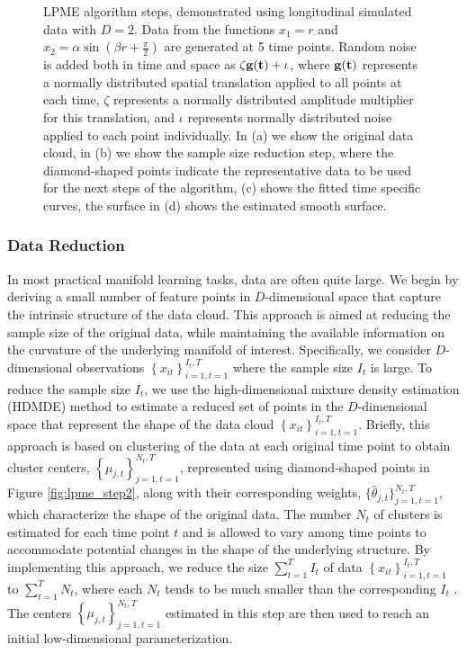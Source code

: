 \documentclass[12pt]{article}
\theoremstyle{definition}
\begin{document}
\begin{figure}
  \caption{{\footnotesize LPME algorithm steps, demonstrated using longitudinal simulated data with $D=2$. Data from the functions $x_1 = r$ and $x_2 = \alpha \sin \left(\beta r + \frac{\pi}{2}\right)$ are generated at 5 time points. Random noise is added both in time and space as $\zeta \bf{g}(t) + \iota$, where $\bf{g}(t)$ represents a normally distributed spatial translation applied to all points at each time, $\zeta$ represents a normally distributed amplitude multiplier for this translation, and $\iota$ represents normally distributed noise applied to each point individually. In (a) we show the original data cloud, in (b) we show the sample size reduction step, where the diamond-shaped points indicate the representative data to be used for the next steps of the algorithm, (c) shows the fitted time specific curves, the surface in (d) shows the estimated smooth surface.} }
  \label{fig:lpme_steps}
\end{figure}


\subsubsection{Data Reduction}

In most practical manifold learning tasks, data are often quite large. We begin by deriving a small number of feature points in $D$-dimensional space that capture the intrinsic structure of the data cloud. This approach is aimed at reducing the sample size of the original data, while maintaining the available information on the curvature of the underlying manifold of interest. Specifically, we consider $D$-dimensional observations $\left\{x_{it}\right\}_{i=1, t=1}^{I_t, T}$ where the sample size $I_t$ is large. To reduce the sample size $I_t$, we use the high-dimensional mixture density estimation (HDMDE) method \citep[see][alg. 1]{meng2021Principal} to estimate a reduced set of points in the $D$-dimensional space that represent the shape of the data cloud $\left\{x_{it}\right\}_{i=1, t=1}^{I_t, T}$. Briefly, this approach is based on clustering of the data at each original time point to obtain cluster centers, $\left\{\mu_{j, t}\right\}_{j=1, t=1}^{N_t, T}$, represented using diamond-shaped points in Figure \ref{fig:lpme_step2}, along with their corresponding weights, $\{\hat{\theta}_{j, t}\}_{j=1, t=1}^{N_t, T}$, which characterize the shape of the original data. The number $N_t$ of clusters is estimated for each time point $t$ and is allowed to vary among time points to accommodate potential changes in the shape of the underlying structure. By implementing this approach, we reduce the size $\sum_{t=1}^T I_t$ of data $\left\{x_{it}\right\}_{i=1, t=1}^{I_t, T}$ to $\sum_{t=1}^T N_t$, where each $N_t$ tends to be much smaller than the corresponding $I_t$ \citep[see the simulation study presented in][fig. 3(c)]{meng2021Principal}. The centers $\left\{\mu_{j, t}\right\}_{j=1, t=1}^{N_t, T}$ estimated in this step are then used to reach an initial low-dimensional parameterization.
\end{document}
